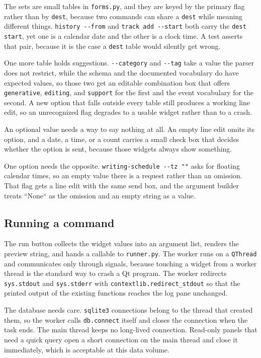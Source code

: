 \documentclass[11pt]{article}
\begin{document}
The sets are small tables in \texttt{forms.py}, and they are keyed by the primary flag
rather than by \texttt{dest}, because two commands can share a \texttt{dest} while meaning
different things. \texttt{history -{}-{}from} and \texttt{track add -{}-{}start} both carry the \texttt{dest}
\texttt{start}, yet one is a calendar date and the other is a clock time. A test
asserts that pair, because it is the case a \texttt{dest} table would silently get
wrong.

One more table holds suggestions. \texttt{-{}-{}category} and \texttt{-{}-{}tag} take a value the
parser does not restrict, while the schema and the documented vocabulary do
have expected values, so those two get an editable combination box that offers
\texttt{generative}, \texttt{editing}, and \texttt{support} for the first and the event vocabulary
for the second. A new option that falls outside every table still produces a
working line edit, so an unrecognized flag degrades to a usable widget rather
than to a crash.

An optional value needs a way to say nothing at all. An empty line edit omits
its option, and a date, a time, or a count carries a small check box that
decides whether the option is sent, because those widgets always show
something.

One option needs the opposite. \texttt{writing-schedule -{}-{}tz ""} asks for floating
calendar times, so an empty value there is a request rather than an omission.
That flag gets a line edit with the same send box, and the argument builder
treats ``None`` as the omission and an empty string as a value.
\subsection{Running a command}
\label{sec:orgf1c654e}

The run button collects the widget values into an argument list, renders the
preview string, and hands a callable to \texttt{runner.py}. The worker runs on a
\texttt{QThread} and communicates only through signals, because touching a widget from
a worker thread is the standard way to crash a Qt program. The worker
redirects \texttt{sys.stdout} and \texttt{sys.stderr} with \texttt{contextlib.redirect\_stdout} so that
the printed output of the existing functions reaches the log pane unchanged.

The database needs care. \texttt{sqlite3} connections belong to the thread that
created them, so the worker calls \texttt{db.connect} itself and closes the connection
when the task ends. The main thread keeps no long-lived connection. Read-only
panels that need a quick query open a short connection on the main thread and
close it immediately, which is acceptable at this data volume.
\end{document}
